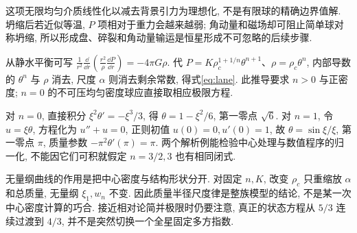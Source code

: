 这项无限均匀介质线性化以减去背景引力为理想化, 不是有限球的精确边界值解. 坍缩后若近似等温, $P$ 项相对于重力会越来越弱; 角动量和磁场却可阻止简单球对称坍缩, 所以形成盘、碎裂和角动量输运是恒星形成不可忽略的后续步骤.

从静水平衡可写 $\frac1{r^2}\frac{\dd}{\dd r}(\frac{r^2}{\rho}\frac{\dd P}{\dd r})=-4\pi G\rho$. 代 $P=K\rho_c^{1+1/n}\theta^{n+1}$、$\rho=\rho_c\theta^n$, 内部导数的 $\theta^n$ 与 $\rho$ 消去, 尺度 $\alpha$ 则消去剩余常数, 得式\eqref{eq:lane}. 此推导要求 $n>0$ 与正密度; $n=0$ 的不可压均匀密度球应直接取相应极限方程.

对 $n=0$, 直接积分 $\xi^2\theta'=-\xi^3/3$, 得 $\theta=1-\xi^2/6$, 第一零点 $\sqrt6$. 对 $n=1$, 令 $u=\xi\theta$, 方程化为 $u''+u=0$, 正则初值 $u(0)=0,u'(0)=1$, 故 $\theta=\sin\xi/\xi$, 第一零点 $\pi$, 质量参数 $-\pi^2\theta'(\pi)=\pi$. 两个解析例能检验中心处理与数值程序的归一化, 不能因它们可积就假定 $n=3/2,3$ 也有相同闭式.

无量纲曲线的作用是把中心密度与结构形状分开. 对固定 $n,K$, 改变 $\rho_c$ 只重缩放 $\alpha$ 和总质量, 无量纲 $\xi_1,w_n$ 不变. 因此质量半径尺度律是整族模型的结论, 不是某一次中心密度计算的巧合. 接近相对论简并极限时仍要注意, 真正的状态方程从 $5/3$ 连续过渡到 $4/3$, 并不是突然切换一个全星固定多方指数.
